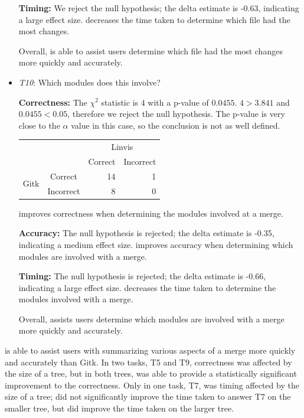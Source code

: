 \begin{itemize}
    \textbf{Timing:} We reject the null hypothesis; the delta estimate
    is -0.63, indicating a large effect size. \tool decreases the time
    taken to determine which file had the most changes.

    Overall, \tool is able to assist users determine which file had the
    most changes more quickly and accurately.

  \item \emph{T10}: Which modules does this \mt involve?

    \textbf{Correctness:}
    The $\chi^2$ statistic is $4$ with a p-value of $0.0455$.
    $4 > 3.841$ and $0.0455 < 0.05$, therefore we reject the null
    hypothesis. The p-value is very close to the $\alpha$ value in this
    case, so the conclusion is not as well defined.

    \vspace{2mm}
    \begin{tabular}{cc|rr}
      &           & \multicolumn{2}{c}{Linvis}\\
      &           & Correct                      & Incorrect\\\hline
      \multirow{2}{*}{Gitk}   & Correct   & 14                           & 1\\
      & Incorrect & 8                            & 0\\
    \end{tabular}
    \vspace{3mm}

    \tool improves correctness when determining the modules involved at
    a merge.

    \textbf{Accuracy:} The null hypothesis is rejected; the delta
    estimate is -0.35, indicating a medium effect size. \tool improves
    accuracy when determining which modules are involved with a merge.

    \textbf{Timing:} The null hypothesis is rejected; the delta estimate
    is -0.66, indicating a large effect size. \tool decreases the time
    taken to determine the modules involved with a merge.

    Overall, \tool assists users determine which modules are involved
    with a merge more quickly and accurately.

\end{itemize}


\tool is able to assist users with summarizing various aspects of a
merge more quickly and accurately than Gitk. In two tasks, T5 and T9,
correctness was affected by the size of a tree, but in both trees, \tool
was able to provide a statistically significant improvement to the
correctness. Only in one task, T7, was timing affected by the size of a
tree; \tool did not significantly improve the time taken to answer T7 on
the smaller tree, but did improve the time taken on the larger tree.

